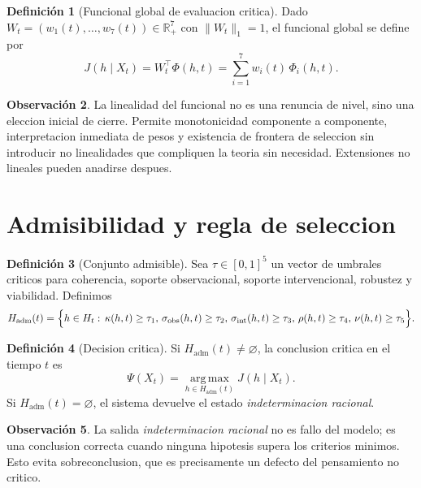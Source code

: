 \documentclass[12pt,a4paper]{article}
\newcommand{\R}{\mathbb{R}}
\newcommand{\argmax}{\operatorname*{arg\,max}}
\theoremstyle{definition}
\newtheorem{definition}{Definici\'on}[section]
\newtheorem{remark}[definition]{Observaci\'on}
\theoremstyle{plain}
\theoremstyle{remark}
\begin{document}
\begin{definition}[Funcional global de evaluacion critica]
Dado $W_t=(w_1(t),\dots,w_7(t))\in\R_+^7$ con $\|W_t\|_1=1$, el funcional global se define por
\begin{equation}\label{eq:score}
J(h\mid X_t)=W_t^\top \Phi(h,t)=\sum_{i=1}^7 w_i(t)\,\Phi_i(h,t).
\end{equation}
\end{definition}

\begin{remark}
La linealidad del funcional no es una renuncia de nivel, sino una eleccion inicial de cierre. Permite monotonicidad componente a componente, interpretacion inmediata de pesos y existencia de frontera de seleccion sin introducir no linealidades que compliquen la teoria sin necesidad. Extensiones no lineales pueden anadirse despues.
\end{remark}

\section{Admisibilidad y regla de seleccion}

\begin{definition}[Conjunto admisible]
Sea $\tau\in[0,1]^5$ un vector de umbrales criticos para coherencia, soporte observacional, soporte intervencional, robustez y viabilidad. Definimos
\begin{equation}
H_{\mathrm{adm}}(t)=\Bigl\{h\in H_t:\, \kappa(h,t)\ge \tau_1,\, \sigma_{\mathrm{obs}}(h,t)\ge \tau_2,\, \sigma_{\mathrm{int}}(h,t)\ge \tau_3,\, \rho(h,t)\ge \tau_4,\, \nu(h,t)\ge \tau_5\Bigr\}.
\end{equation}
\end{definition}

\begin{definition}[Decision critica]
Si $H_{\mathrm{adm}}(t)\neq\varnothing$, la conclusion critica en el tiempo $t$ es
\begin{equation}
\Psi(X_t)=\argmax_{h\in H_{\mathrm{adm}}(t)} J(h\mid X_t).
\end{equation}
Si $H_{\mathrm{adm}}(t)=\varnothing$, el sistema devuelve el estado \emph{indeterminacion racional}.
\end{definition}

\begin{remark}
La salida \emph{indeterminacion racional} no es fallo del modelo; es una conclusion correcta cuando ninguna hipotesis supera los criterios minimos. Esto evita sobreconclusion, que es precisamente un defecto del pensamiento no critico.
\end{remark}
\end{document}
